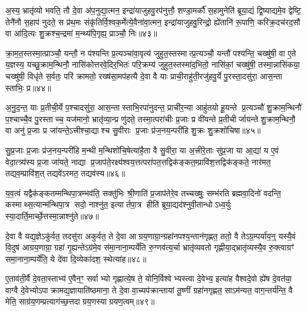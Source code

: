 अ॒स्य॒ भ्रातृ॑व्यो भवति॒ तौ दे॒वा अ॑प॒नुद्या॒त्मन॒ इन्द्रा॑याजुहवु॒रप॑नुत्तौ॒ शण्डा॒मर्कौ॑ स॒हामुनेति॑ ब्रूया॒द्यं द्वि॒ष्याद्यमे॒व द्वेष्टि॒ तेनै॑नौ स॒हाप॑ नुदते॒ स प्र॑थ॒मः संकृ॑तिर्वि॒श्वक॒र्मेत्ये॒वैना॑वा॒त्मन॒ इन्द्रा॑याजुहवु॒रिन्द्रो॒ ह्ये॑तानि॑ रू॒पाणि॒ करि॑क्र॒दच॑रद॒सौ वा आ॑दि॒त्यः शु॒क्रश्च॒न्द्रमा॑ म॒न्थ्य॑पि॒गृह्य॒ प्राञ्चौ॒ निः॥४३॥

क्रा॒म॒त॒स्तस्मा॒त्प्राञ्चौ॒ यन्तौ॒ न प॑श्यन्ति प्र॒त्यञ्चा॑वा॒वृत्य॑ जुहुत॒स्तस्मात्प्र॒त्यञ्चौ॒ यन्तौ॑ पश्यन्ति॒ चख्षु॑षी॒ वा ए॒ते य॒ज्ञस्य॒ यच्छु॒क्राम॒न्थिनौ॒ नासि॑कोत्तरवे॒दिर॒भितः॑ परि॒क्रम्य॑ जुहुत॒स्तस्मा॑द॒भितो॒ नासि॑कां॒ चख्षु॑षी॒ तस्मा॒न्नासि॑कया॒ चख्षु॑षी॒ विधृ॑ते स॒र्वतः॒ परि॑ क्रामतो॒ रख्ष॑सा॒मप॑हत्यै दे॒वा वै याः प्राची॒राहु॑ती॒रजु॑हवु॒र्ये पु॒रस्ता॒दसु॑रा॒ आस॒न्ता स्ताभिः॒ प्र॥४४॥

अ॒नु॒द॒न्त॒ याः प्र॒तीची॒र्ये प॒श्चादसु॑रा॒ आस॒न्तास्ताभि॒रपा॑नुदन्त॒ प्राची॑र॒न्या आहु॑तयो हू॒यन्ते प्र॒त्यञ्चौ॑ शु॒क्राम॒न्थिनौ॑ प॒श्चाच्चै॒व पु॒रस्ताच्च॒ यज॑मानो॒ भ्रातृ॑व्या॒न्प्र णु॑दते॒ तस्मा॒त्परा॑चीः प्र॒जाः प्र वी॑यन्ते प्र॒तीचीर्जायन्ते शु॒क्राम॒न्थिनौ॒ वा अनु॑ प्र॒जाः प्र जा॑यन्ते॒ऽत्त्रीश्चा॒द्याश्च सु॒वीराः प्र॒जाः प्र॑ज॒नय॒न्परी॑हि शु॒क्रः शु॒क्रशो॑चिषा॥४५॥

सु॒प्र॒जाः प्र॒जाः प्र॑ज॒नय॒न्परी॑हि म॒न्थी म॒न्थिशो॑चि॒षेत्या॑है॒ता वै सु॒वीरा॒ या अ॒त्त्रीरे॒ताः सु॑प्र॒जा या आ॒द्या॑ य ए॒वं वेदा॒त्त्र्य॑स्य प्र॒जा जा॑यते॒ नाद्या प्र॒जाप॑ते॒रक्ष्य॑श्वय॒त्तत्परा॑पत॒त्तद्विक॑ङ्कत॒म्प्रावि॑श॒त्तद्विक॑ङ्कते॒ नार॑मत॒ तद्यव॒म्प्रावि॑श॒त् तद्यवे॑ऽरमत॒ तद्यव॑स्य॥४६॥

य॒व॒त्वं यद्वैक॑ङ्कतम्मन्थिपा॒त्रम्भव॑ति॒ सक्तु॑भिः श्री॒णाति॑ प्र॒जाप॑तेरे॒व तच्चख्षुः॒ सम्भ॑रति ब्रह्मवा॒दिनो॑ वदन्ति॒ कस्माथ्स॒त्यान्म॑न्थिपा॒त्र सदो॒ नाश्नु॑त॒ इत्यार्तपा॒त्र हीति॑ ब्रूया॒द्यद॑श्नुवी॒तान्धोऽध्व॒र्युः स्या॒दार्ति॒मार्च्छे॒त्तस्मा॒न्नाश्नु॑ते॥४७॥

{\anuvakamend[{आ॒त्मना॒ परा॒ निष्प्र शु॒क्रशो॑चिषा॒ यव॑स्य स॒प्तत्रिꣳ॑शच्च॥10॥}]}

दे॒वा वै यद्य॒ज्ञेऽकु॑र्वत॒ तदसु॑रा अकुर्वत॒ ते दे॒वा आग्रय॒णाग्रा॒न्ग्रहा॑नपश्य॒न्तान॑गृह्णत॒ ततो॒ वै तेऽग्र॒म्पर्या॑य॒न्॒ यस्यै॒वं वि॒दुष॑ आग्रय॒णाग्रा॒ ग्रहा॑ गृ॒ह्यन्तेऽग्र॑मे॒व स॑मा॒नाना॒म्पर्ये॑ति रु॒ग्णव॑त्य॒र्चा भ्रातृ॑व्यवतो गृह्णीया॒द्भ्रातृ॑व्यस्यै॒व रु॒क्त्वाग्रꣳ॑ समा॒नाना॒म्पर्ये॑ति॒ ये दे॑वा दि॒व्येका॑दश॒ स्थेत्या॑ह॥४८॥

ए॒ताव॑ती॒र्वै दे॒वता॒स्ताभ्य॑ ए॒वैन॒ꣳ॒ सर्वाभ्यो गृह्णात्ये॒ष ते॒ योनि॒र्विश्वेभ्यस्त्वा दे॒वेभ्य॒ इत्या॑ह वैश्वदे॒वो ह्ये॑ष दे॒वत॑या॒ वाग्वै दे॒वेभ्योऽपाक्रामद्य॒ज्ञायाति॑ष्ठमाना॒ ते दे॒वा वा॒च्यप॑क्रान्तायां तू॒ष्णीं ग्रहा॑नगृह्णत॒ साऽम॑न्यत॒ वाग॒न्तर्य॑न्ति॒ वै मेति॒ साग्र॑य॒णम्प्रत्याग॑च्छ॒त्तदाग्रय॒णस्याग्रयण॒त्वम्॥४९॥

